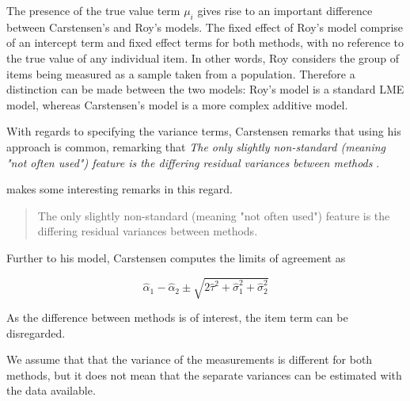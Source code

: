 \documentclass[12pt, a4paper]{report}
\theoremstyle{plain}
\theoremstyle{definition}
\theoremstyle{remark}
\begin{document}

The presence of the true value term $\mu_i$ gives rise to an important difference between Carstensen's and Roy's models. The fixed effect of Roy's model comprise of an intercept term and fixed effect terms for both methods, with no reference to the true value of any individual item. In other words, Roy considers the group of items being measured as a sample taken from a population. Therefore a distinction can be made between the two models: Roy's model is a standard LME model, whereas Carstensen's model is a more complex additive model.



With regards to specifying the variance terms, Carstensen remarks that using his approach is common, remarking that \emph{
	The only slightly non-standard (meaning "not often used") feature is the differing residual variances between methods }\citep{bxc2010}.

\citet{BXC2008} makes some interesting remarks in this regard.

\begin{quote}
	The only slightly non-standard (meaning "not often used") feature
	is the differing residual variances between methods.
\end{quote}

Further to his model, Carstensen computes the limits of agreement
as

\[
\hat{\alpha}_1 - \hat{\alpha}_2 \pm \sqrt{2 \hat{\tau}^2 +
	\hat{\sigma}^2_1 + \hat{\sigma}^2_2}
\]
\newpage



As the difference between methods is of interest, the item term can be disregarded.

We assume that that the variance of the measurements is different for both methods, but it does not mean that the separate variances can be estimated with the data available.\\



\end{document}
